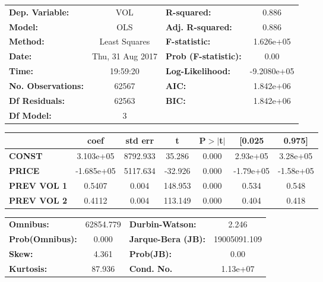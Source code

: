 \documentclass{article}
\begin{document}
\begin{center}
\begin{tabular}{lclc}
\toprule
\textbf{Dep. Variable:}    &        VOL         & \textbf{  R-squared:         } &      0.886    \\
\textbf{Model:}            &       OLS        & \textbf{  Adj. R-squared:    } &      0.886    \\
\textbf{Method:}           &  Least Squares   & \textbf{  F-statistic:       } &  1.626e+05    \\
\textbf{Date:}             & Thu, 31 Aug 2017 & \textbf{  Prob (F-statistic):} &      0.00     \\
\textbf{Time:}             &     19:59:20     & \textbf{  Log-Likelihood:    } & -9.2080e+05   \\
\textbf{No. Observations:} &       62567      & \textbf{  AIC:               } &  1.842e+06    \\
\textbf{Df Residuals:}     &       62563      & \textbf{  BIC:               } &  1.842e+06    \\
\textbf{Df Model:}         &           3      & \textbf{                     } &               \\
\bottomrule
\end{tabular}
\begin{tabular}{lcccccc}
               & \textbf{coef} & \textbf{std err} & \textbf{t} & \textbf{P$>$$|$t$|$} & \textbf{[0.025} & \textbf{0.975]}  \\
\midrule
\textbf{CONST} &    3.103e+05  &     8792.933     &    35.286  &         0.000        &     2.93e+05    &     3.28e+05     \\
\textbf{PRICE}    &   -1.685e+05  &     5117.634     &   -32.926  &         0.000        &    -1.79e+05    &    -1.58e+05     \\
\textbf{PREV VOL 1}    &       0.5407  &        0.004     &   148.953  &         0.000        &        0.534    &        0.548     \\
\textbf{PREV VOL 2}    &       0.4112  &        0.004     &   113.149  &         0.000        &        0.404    &        0.418     \\
\bottomrule
\end{tabular}
\begin{tabular}{lclc}
\textbf{Omnibus:}       & 62854.779 & \textbf{  Durbin-Watson:     } &      2.246    \\
\textbf{Prob(Omnibus):} &    0.000  & \textbf{  Jarque-Bera (JB):  } & 19005091.109  \\
\textbf{Skew:}          &    4.361  & \textbf{  Prob(JB):          } &       0.00    \\
\textbf{Kurtosis:}      &   87.936  & \textbf{  Cond. No.          } &   1.13e+07    \\
\bottomrule
\end{tabular}
\end{center} 
\end{document}
